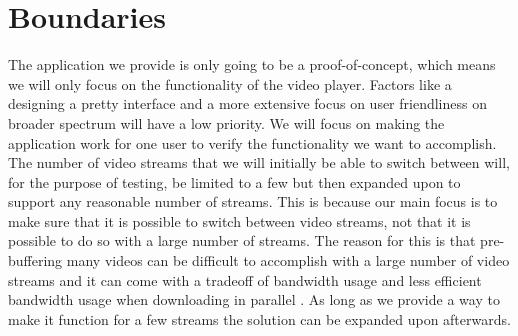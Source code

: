 \section{Boundaries}
\label{sec:boundaries}

The application we provide is only going to be a proof-of-concept, which means we will only focus on the functionality of the video player. Factors like a designing a pretty interface and a more extensive focus on user friendliness on broader spectrum will have a low priority. We will focus on making the application work for one user to verify the functionality we want to accomplish. The number of video streams that we will initially be able to switch between will, for the purpose of testing, be limited to a few but then expanded upon to support any reasonable number of streams. This is because our main focus is to make sure that it is possible to switch between video streams, not that it is possible to do so with a large number of streams. The reason for this is that pre-buffering many videos can be difficult to accomplish with a large number of video streams and it can come with a tradeoff of bandwidth usage \cite{watchingprefetching} and less efficient bandwidth usage when downloading in parallel \cite{scalableOnDemand}. As long as we provide a way to make it function for a few streams the solution can be expanded upon afterwards.